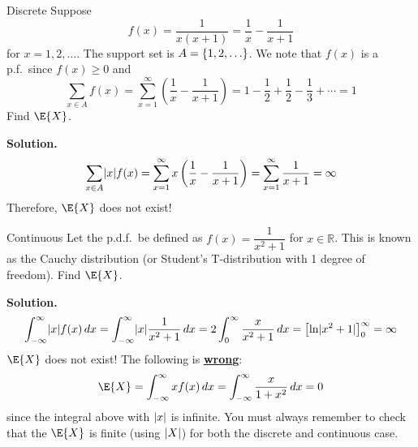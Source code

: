 \begin{Example}{Discrete}{}
    Suppose
    \[ f(x)=\frac{1}{x(x+1)}=\frac{1}{x} -\frac{1}{x+1}  \]
    for $ x=1,2,\ldots $. The support set is $ A=\{1,2,\ldots\} $.
    We note that $ f(x) $ is a p.f.\ since
    $ f(x)\ge 0 $ and
    \[ \sum\limits_{x\in A}f(x)=\sum\limits_{x=1}^{\infty}
        \left( \frac{1}{x} -\frac{1}{x+1} \right)=
        1-\frac{1}{2} +\frac{1}{2} -\frac{1}{3} +\cdots=1  \]
    Find $ \E{X} $.

    \textbf{Solution.}
    \[ \sum\limits_{x\in A}\lvert x\rvert f(x)=\sum\limits_{x=1}^{\infty}
        x\left( \frac{1}{x} -\frac{1}{x+1} \right)
        =\sum\limits_{x=1}^{\infty} \frac{1}{x+1} =\infty  \]
    Therefore, $ \E{X} $ does not exist!
\end{Example}

\begin{Example}{Continuous}{}
    Let the p.d.f.\ be defined as $ f(x)=\dfrac{1}{x^2+1} $ for
    $ x\in\mathbb{R} $. This is known as the Cauchy distribution
    (or Student's T-distribution with 1 degree of freedom). Find $ \E{X} $.

    \textbf{Solution.}
    \[ \int_{-\infty}^{\infty} \lvert x\rvert f(x)\, d{x} =
        \int_{-\infty}^{\infty} \lvert x\rvert\frac{1}{x^2+1} \, d{x}=
        2 \int_{0}^{\infty} \frac{x}{x^2+1} \, d{x} =
        \bigl[\ln\lvert x^2+1\rvert\bigr]_0^\infty=\infty \]
    $ \E{X} $ does not exist! The following is \underline{\textbf{wrong}}:
    \[ \E{X}=\int_{-\infty}^{\infty}x f(x)\, d{x}=
        \int_{-\infty}^{\infty} \frac{x}{1+x^2} \, d{x}=0  \]
    since the integral above with $ \lvert x\rvert $ is infinite. You must
    always remember to check that the $ \E{X} $ is finite
    (using $ \lvert X\rvert $) for both the discrete and continuous case.
\end{Example}

